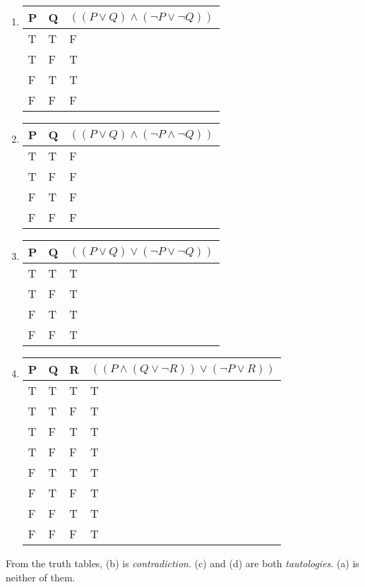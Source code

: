     \begin{solution}
        \begin{enumerate}[label=(\alph*)]
            \item {
                \begin{tabular}[c]{l l | l}
                    P & Q & $((P \vee Q) \wedge (\neg P \vee \neg Q))$ \\ \hline
                    T & T & F \\
                    T & F & T \\
                    F & T & T \\
                    F & F & F
                \end{tabular}
            }
            
            \item {
                \begin{tabular}[c]{l l | l}
                    P & Q & $((P \vee Q) \wedge (\neg P \wedge \neg Q))$ \\ \hline
                    T & T & F \\
                    T & F & F \\
                    F & T & F \\
                    F & F & F
                \end{tabular}
            }
            
            \item {
                \begin{tabular}[c]{l l | l}
                    P & Q & $((P \vee Q) \vee (\neg P \vee \neg Q))$ \\ \hline
                    T & T & T \\
                    T & F & T \\
                    F & T & T \\
                    F & F & T
                \end{tabular}
            }
            
            \item {
                \begin{tabular}[c]{l l l | l}
                    P & Q & R & $((P \wedge (Q \vee \neg R)) \vee (\neg P \vee R))$ \\ \hline
                    T & T & T & T \\
                    T & T & F & T \\
                    T & F & T & T \\
                    T & F & F & T \\
                    F & T & T & T \\
                    F & T & F & T \\
                    F & F & T & T \\
                    F & F & F & T
                \end{tabular}
            }
        \end{enumerate}
        From the truth tables, (b) is \textit{contradiction}. (c) and (d) are both \textit{tautologies}. (a) is neither of them.
    \end{solution}

